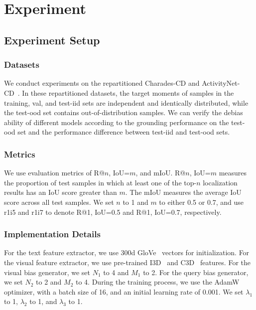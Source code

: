 \section{Experiment}

\subsection{Experiment Setup}

\subsubsection{Datasets}

We conduct experiments on the repartitioned Charades-CD and ActivityNet-CD~\cite{lan2022closer}. 
In these repartitioned datasets, the target moments of samples in the training, val, and test-iid sets are independent and identically distributed, while the test-ood set contains out-of-distribution samples. 
We can verify the debias ability of different models according to the grounding performance on the test-ood set and the performance difference between test-iid and test-ood sets.


\subsubsection{Metrics}
We use evaluation metrics of R@$n$, IoU=$m$, and mIoU. 
R@$n$, IoU=$m$ measures the proportion of test samples in which at least one of the top-$n$ localization results has an IoU score greater than $m$. 
The mIoU measures the average IoU score across all test samples. 
We set $n$ to 1 and $m$ to either 0.5 or 0.7, and use r1i5 and r1i7 to denote R@1, IoU=0.5 and R@1, IoU=0.7, respectively.


\subsubsection{Implementation Details}
For the text feature extractor, we use 300d GloVe~\cite{Glove} vectors for initialization. For the visual feature extractor, we use pre-trained I3D~\cite{I3D} and C3D~\cite{C3D} features. For the visual bias generator, we set $N_1$ to 4 and $M_1$ to 2. For the query bias generator, we set $N_2$ to 2 and $M_2$ to 4. During the training process, we use the AdamW~\cite{AdamW} optimizer, with a batch size of 16, and an initial learning rate of 0.001. We set $\lambda_{1}$ to 1, $\lambda_{2}$ to 1, and $\lambda_{3}$ to 1. 


